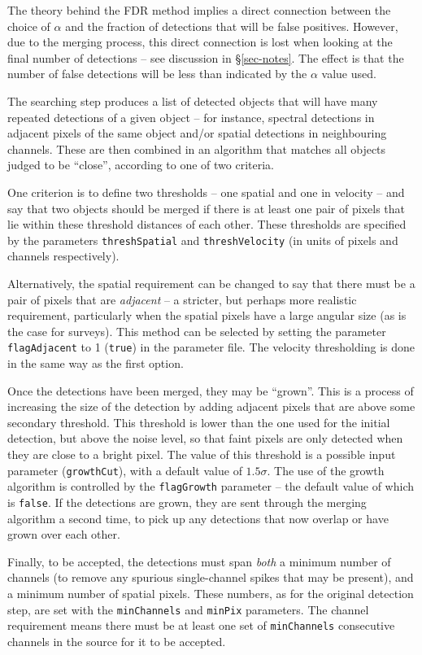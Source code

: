 The theory behind the FDR method implies a direct connection between
the choice of $\alpha$ and the fraction of detections that will be
false positives. However, due to the merging process, this direct
connection is lost when looking at the final number of detections --
see discussion in \S\ref{sec-notes}. The effect is that the number of
false detections will be less than indicated by the $\alpha$ value
used.


\label{sec-merger}

The searching step produces a list of detected objects that will have
many repeated detections of a given object -- for instance, spectral
detections in adjacent pixels of the same object and/or spatial
detections in neighbouring channels. These are then combined in an
algorithm that matches all objects judged to be ``close'', according
to one of two criteria.

One criterion is to define two thresholds -- one spatial and one in
velocity -- and say that two objects should be merged if there is at
least one pair of pixels that lie within these threshold distances of
each other. These thresholds are specified by the parameters
\texttt{threshSpatial} and \texttt{threshVelocity} (in units of pixels
and channels respectively).

Alternatively, the spatial requirement can be changed to say that
there must be a pair of pixels that are \emph{adjacent} -- a stricter,
but perhaps more realistic requirement, particularly when the spatial
pixels have a large angular size (as is the case for 
\hi surveys). This 
method can be selected by setting the parameter
\texttt{flagAdjacent} to 1 (\ie \texttt{true}) in the parameter
file. The velocity thresholding is done in the same way as the first
option.

Once the detections have been merged, they may be ``grown''. This is a
process of increasing the size of the detection by adding adjacent
pixels that are above some secondary threshold. This threshold is
lower than the one used for the initial detection, but above the noise
level, so that faint pixels are only detected when they are close to a
bright pixel. The value of this threshold is a possible input
parameter (\texttt{growthCut}), with a default value of
$1.5\sigma$. The use of the growth algorithm is controlled by the
\texttt{flagGrowth} parameter -- the default value of which is
\texttt{false}. If the detections are grown, they are sent through the
merging algorithm a second time, to pick up any detections that now
overlap or have grown over each other.

Finally, to be accepted, the detections must span \emph{both} a
minimum number of channels (to remove any spurious single-channel
spikes that may be present), and a minimum number of spatial
pixels. These numbers, as for the original detection step, are set
with the \texttt{minChannels} and \texttt{minPix} parameters. The
channel requirement means there must be at least one set of
\texttt{minChannels} consecutive channels in the source for it to be
accepted.
